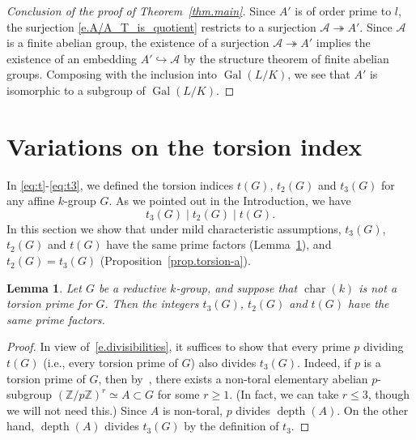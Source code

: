 \documentclass[12pt]{amsart}
\numberwithin{equation}{section}
\newtheorem{lemma}[theorem]{Lemma}
\theoremstyle{remark}
\newcommand{\Gal}{\operatorname{Gal}}
\newcommand{\Char}{\operatorname{char}}
\newcommand{\depth}{\operatorname{depth}}
\newcommand{\bZ}{\mathbb{Z}}
\begin{document}
\begin{proof}[Conclusion of the proof of Theorem~\ref{thm.main}]

Since $A'$ is of order prime to $l$, the surjection \eqref{e.A/A_T_is_quotient} restricts to a surjection $\mathcal{A} \twoheadrightarrow A'$. Since $\mathcal{A}$ is a finite abelian group, the existence of a surjection $\mathcal{A} \twoheadrightarrow A'$ implies the existence of an embedding $A'\hookrightarrow \mathcal{A}$ by the structure theorem of finite abelian groups. Composing with the inclusion into $\Gal(L/K)$, we see that $A'$ is isomorphic to a subgroup of $\Gal(L/K)$.
\end{proof}


\section{Variations on the torsion index}
\label{sect.t_2=t_3}

In \eqref{eq:t}-\eqref{eq:t3}, we defined the torsion indices $t(G)$, $t_2(G)$ and $t_3(G)$ for any affine $k$-group $G$. As we pointed out in the Introduction, we have 
\begin{equation} \label{e.divisibilities}
t_3(G) \mid t_2(G) \mid t(G).
\end{equation}
In this section we show that under mild characteristic assumptions, $t_3(G)$, $t_2(G)$ and $t(G)$ have the same prime factors (Lemma~\ref{lem.same-prime-factors}), and $t_2(G) = t_3(G)$ (Proposition~\ref{prop.torsion-a}).

\begin{lemma} \label{lem.same-prime-factors}
Let $G$ be a reductive $k$-group, and suppose that $\Char(k)$ is not a torsion prime for $G$. Then the integers $t_3(G)$, $t_2(G)$ and $t(G)$ have the same prime factors.
\end{lemma}

\begin{proof} 
In view of~\eqref{e.divisibilities}, it suffices to show that every prime $p$ dividing $t(G)$ (i.e., every torsion prime of $G$) also divides $t_3(G)$. Indeed, if $p$ is a torsion prime of $G$,
then by~\cite[Theorem 2.28]{steinberg-torsion}, there exists a non-toral elementary abelian $p$-subgroup $(\bZ/p\bZ)^r \simeq A \subset G$ for some $r \geqslant 1$. (In fact, we can take $r \leqslant 3$, though we will not need this.) Since $A$ is non-toral, $p$ divides $\depth(A)$. On the other hand, $\depth(A)$ divides $t_3(G)$ by the definition of $t_3$.
\end{proof}
\end{document}

